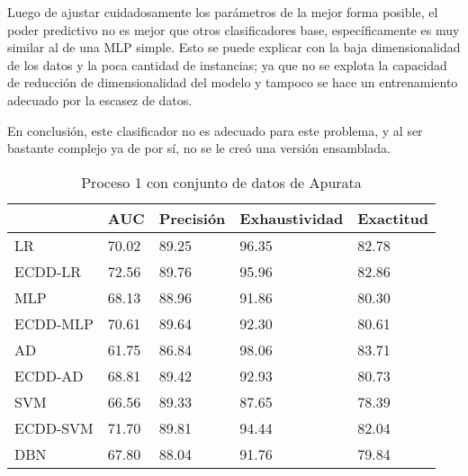 Luego de ajustar cuidadosamente los parámetros de la mejor forma posible, el poder predictivo no es mejor que otros clasificadores base, específicamente es muy similar al de una \ac{MLP} simple. Esto se puede explicar con la baja dimensionalidad de los datos y la poca cantidad de instancias; ya que no se explota la capacidad de reducción de dimensionalidad del modelo y tampoco se hace un entrenamiento adecuado por la escasez de datos.

En conclusión, este clasificador no es adecuado para este problema, y al ser bastante complejo ya de por sí, no se le creó una versión ensamblada.


\begin{table}[]
\centering
\caption{Proceso 1 con conjunto de datos de Apurata}
\label{tab:apurata-proc1}
\begin{tabularx}{0.75\textwidth}{|l|Y Y Y Y|}
                \hline
                & AUC       & Precisión & Exhaustividad    & Exactitud  \\
                \hline
LR              & 70.02     & 89.25     & 96.35     & 82.78     \\
ECDD-LR           & 72.56     & 89.76     & 95.96     & 82.86     \\
                \hline
MLP             & 68.13     & 88.96     & 91.86     & 80.30     \\
ECDD-MLP          & 70.61     & 89.64     & 92.30     & 80.61     \\
                \hline
AD              & 61.75     & 86.84     & 98.06     & 83.71     \\
ECDD-AD           & 68.81     & 89.42     & 92.93     & 80.73     \\
                \hline
SVM             & 66.56     & 89.33     & 87.65     & 78.39     \\
ECDD-SVM          & 71.70     & 89.81     & 94.44     & 82.04     \\
                \hline
DBN             & 67.80     & 88.04     & 91.76     & 79.84     \\
                \hline
\end{tabularx}
\end{table}


